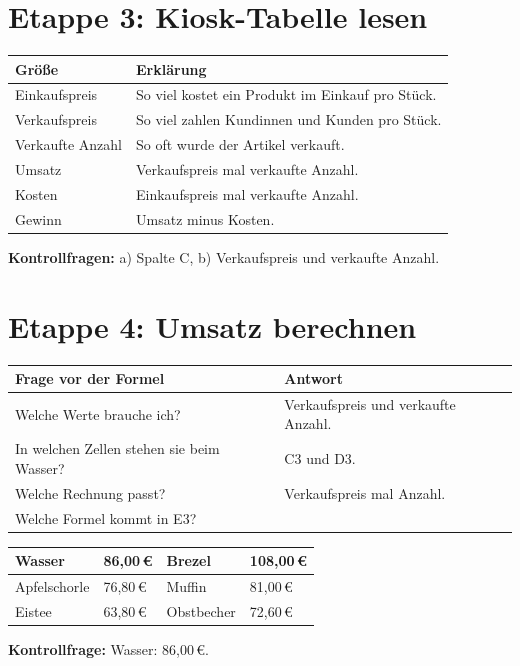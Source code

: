 \section*{Etappe 3: Kiosk-Tabelle lesen}
\begin{tabularx}{\textwidth}{|L{4cm}|Y|}
\hline
{}\textbf{Größe} & \textbf{Erklärung}\\\hline
Einkaufspreis & So viel kostet ein Produkt im Einkauf pro Stück.\\\hline
Verkaufspreis & So viel zahlen Kundinnen und Kunden pro Stück.\\\hline
Verkaufte Anzahl & So oft wurde der Artikel verkauft.\\\hline
Umsatz & Verkaufspreis mal verkaufte Anzahl.\\\hline
Kosten & Einkaufspreis mal verkaufte Anzahl.\\\hline
Gewinn & Umsatz minus Kosten.\\\hline
\end{tabularx}
\textbf{Kontrollfragen:} a) Spalte C, b) Verkaufspreis und verkaufte Anzahl.

\section*{Etappe 4: Umsatz berechnen}
\begin{tabularx}{\textwidth}{|L{5cm}|Y|}
\hline
{}\textbf{Frage vor der Formel} & \textbf{Antwort}\\\hline
Welche Werte brauche ich? & Verkaufspreis und verkaufte Anzahl.\\\hline
In welchen Zellen stehen sie beim Wasser? & C3 und D3.\\\hline
Welche Rechnung passt? & Verkaufspreis mal Anzahl.\\\hline
Welche Formel kommt in E3? & \\\hline
\end{tabularx}

\begin{tabularx}{\textwidth}{|Y|L{3cm}|Y|L{3cm}|}
\hline
Wasser & 86,00\,\euro{} & Brezel & 108,00\,\euro{}\\\hline
Apfelschorle & 76,80\,\euro{} & Muffin & 81,00\,\euro{}\\\hline
Eistee & 63,80\,\euro{} & Obstbecher & 72,60\,\euro{}\\\hline
\end{tabularx}
\textbf{Kontrollfrage:} Wasser: 86,00\,\euro{}.


